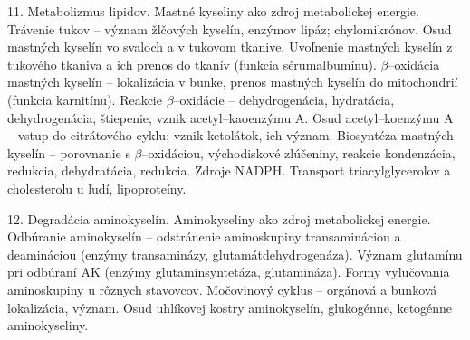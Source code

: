 11. Metabolizmus lipidov. Mastné kyseliny ako zdroj metabolickej energie. Trávenie tukov -- význam žlčových kyselín, enzýmov lipáz; chylomikrónov. Osud mastných kyselín vo svaloch a v tukovom tkanive. Uvoľnenie mastných kyselín z tukového tkaniva a ich prenos do tkanív (funkcia sérumalbumínu). $\beta$--oxidácia mastných kyselín -- lokalizácia v bunke, prenos mastných kyselín do mitochondrií (funkcia karnitínu). Reakcie $\beta$--oxidácie -- dehydrogenácia, hydratácia, dehydrogenácia, štiepenie, vznik acetyl--kaoenzýmu A. Osud acetyl--koenzýmu A -- vstup do citrátového cyklu; vznik
ketolátok, ich význam. Biosyntéza mastných kyselín -- porovnanie s $\beta$--oxidáciou, východiskové zlúčeniny, reakcie kondenzácia, redukcia, dehydratácia, redukcia. Zdroje NADPH. Transport triacylglycerolov a cholesterolu u ľudí, lipoproteíny.

12. Degradácia aminokyselín. Aminokyseliny ako zdroj metabolickej energie. Odbúranie aminokyselín -- odstránenie aminoskupiny transamináciou a deamináciou (enzýmy transaminázy, glutamátdehydrogenáza). Význam glutamínu pri odbúraní AK (enzýmy glutamínsyntetáza, glutamináza). Formy vylučovania aminoskupiny u rôznych stavovcov. Močovinový cyklus -- orgánová a bunková lokalizácia, význam. Osud uhlíkovej kostry aminokyselín, glukogénne, ketogénne aminokyseliny.



